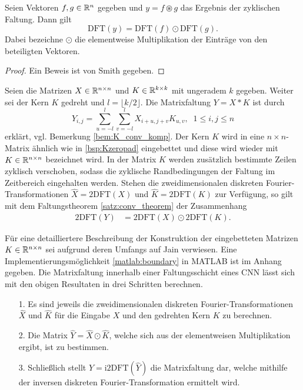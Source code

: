 \begin{satz}
    \label{satz:conv_theorem}
    Seien Vektoren $f,g \in \mathbb{R}^{n}$ gegeben und $y= f \circledast g$ das Ergebnis der zyklischen Faltung. Dann gilt
    \begin{equation}
        \mathrm{DFT}(y)=\mathrm{DFT}(f) \odot \mathrm{DFT}(g).
    \end{equation}
    Dabei bezeichne $\odot$ die elementweise Multiplikation der Einträge von den beteiligten Vektoren.
\end{satz}
\begin{proof}
    Ein Beweis ist von Smith\cite{smith2007mathematics} gegeben.
\end{proof}
\begin{bem}
    Seien die Matrizen $X \in \mathbb{R}^{n \times n}$ und $K \in \mathbb{R}^{k \times k}$ mit ungeradem $k$ gegeben. Weiter sei der Kern $K$ gedreht und $l=\lfloor k/2 \rfloor$. Die Matrixfaltung $Y= X \ast K$ ist durch
    \begin{equation*}
        Y_{i,j}=\sum_{u=-l}^l \sum_{v=-l}^l X_{i+u, j+v} K_{u,v}, \; \; 1 \leq i, j \leq n
    \end{equation*}
    erklärt, vgl. Bemerkung \ref{bem:K_conv_komp}.
    Der Kern $K$ wird in eine $n \times n$-Matrix ähnlich wie in \ref{bsp:Kzeropad} eingebettet und diese wird wieder mit $K \in \mathbb{R}^{n \times n}$ bezeichnet wird. In der Matrix $K$ werden zusätzlich bestimmte Zeilen zyklisch verschoben, sodass die zyklische Randbedingungen der Faltung im Zeitbereich eingehalten werden. Stehen die zweidimensionalen diskreten Fourier-Transformationen $\hat{X}=\mathrm{2DFT}(X)$ und $\hat{K}=\mathrm{2DFT}(K)$ zur Verfügung, so gilt mit dem Faltungstheorem \ref{satz:conv_theorem} der Zusammenhang
    \begin{align*}
        \mathrm{2DFT}(Y)&=\mathrm{2DFT}(X) \odot \mathrm{2DFT}(K). 
    \end{align*}
\end{bem}
Für eine detailliertere Beschreibung der Konstruktion der eingebetteten Matrizen $K \in \mathbb{R}^{n \times n}$ sei aufgrund deren Umfangs auf Jain \cite{jain1989fundamentals} verwiesen. Eine Implementierungsmöglichkeit \ref{matlab:boundary} in MATLAB ist im Anhang gegeben.
Die Matrixfaltung innerhalb einer Faltungsschicht eines CNN lässt sich mit den obigen Resultaten in drei Schritten berechnen.
\begin{itemize}
    \item[1.] Es sind jeweils die zweidimensionalen diskreten Fourier-Transformationen $\hat{X}$ und $\hat{K}$ für die Eingabe $X$ und den gedrehten Kern $K$ zu berechnen.
    \item[2.] Die Matrix $\hat{Y}= \hat{X} \odot \hat{K}$, welche sich aus der elementweisen Multiplikation ergibt, ist zu bestimmen.
    \item[3.] Schließlich stellt $Y=\mathrm{i2DFT}(\hat{Y})$ die Matrixfaltung dar, welche mithilfe der inversen diskreten Fourier-Transformation ermittelt wird.    
\end{itemize} 
